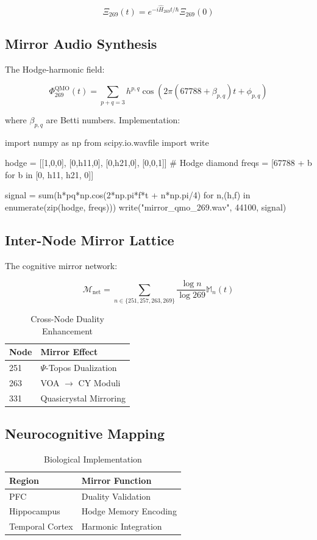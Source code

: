\documentclass[12pt]{article}
\begin{document}
\begin{center}
\[
\Xi_{269}(t) = e^{-i\hat{H}_{269}t/\hbar}\Xi_{269}(0)
\]

\subsection{Mirror Audio Synthesis}
\label{subsec:audio}

The Hodge-harmonic field:

\[
\Phi_{269}^{\text{QMO}}(t) = \sum_{p+q=3} h^{p,q} \cos\left(2\pi(67788 + \beta_{p,q})t + \phi_{p,q}\right)
\]

where $\beta_{p,q}$ are Betti numbers. Implementation:

\begin{python}
import numpy as np
from scipy.io.wavfile import write

hodge = [[1,0,0], [0,h11,0], [0,h21,0], [0,0,1]] # Hodge diamond
freqs = [67788 + b for b in [0, h11, h21, 0]]

signal = sum(h*pq*np.cos(2*np.pi*f*t + n*np.pi/4) 
           for n,(h,f) in enumerate(zip(hodge, freqs)))
write("mirror_qmo_269.wav", 44100, signal)
\end{python}

\subsection{Inter-Node Mirror Lattice}
\label{subsec:lattice}

The cognitive mirror network:

\[
\mathcal{M}_{\text{net}} = \sum_{n\in\{251,257,263,269\}} \frac{\log n}{\log 269} \mathbb{M}_n(t)
\]

\begin{table}[h]
\centering
\caption{Cross-Node Duality Enhancement}
\begin{tabular}{ll}
\hline
\textbf{Node} & \textbf{Mirror Effect} \\
\hline
251 & $\Psi$-Topos Dualization \\
263 & VOA $\to$ CY Moduli \\
331 & Quasicrystal Mirroring \\
\hline
\end{tabular}
\end{table}

\subsection{Neurocognitive Mapping}
\label{subsec:neuro}

\begin{table}[h]
\centering
\caption{Biological Implementation}
\begin{tabular}{ll}
\hline
\textbf{Region} & \textbf{Mirror Function} \\
\hline
PFC & Duality Validation \\
Hippocampus & Hodge Memory Encoding \\
Temporal Cortex & Harmonic Integration \\
\hline
\end{tabular}
\end{table}


\end{center}
\end{document}
